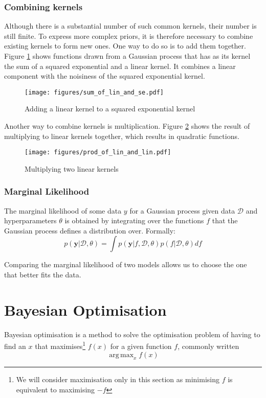 \documentclass[a4paper,12pt,twoside,openright]{report}
\DeclareMathOperator*{\argmax}{arg\,max}
\begin{document}
\subsubsection{Combining kernels}
Although there is a substantial number of such common kernels, their number is still finite. To express more complex priors, it is therefore necessary to combine existing kernels to form new ones. One way to do so is to add them together. Figure \ref{sum_of_lin_and_se} shows functions drawn from a Gaussian process that has as its kernel the sum of a squared exponential and a linear kernel. It combines a linear component with the noisiness of the squared exponential kernel.

\begin{figure}
\centering
  \texttt{[image: figures/sum\_of\_lin\_and\_se.pdf]}
  \caption{Adding a linear kernel to a squared exponential kernel}
  \label{sum_of_lin_and_se}
\end{figure}

Another way to combine kernels is multiplication. Figure \ref{prod_of_lin_and_lin} shows the result of multiplying to linear kernels together, which results in quadratic functions.

\begin{figure}
\centering
  \texttt{[image: figures/prod\_of\_lin\_and\_lin.pdf]}
  \caption{Multiplying two linear kernels}
  \label{prod_of_lin_and_lin}
\end{figure}

\subsubsection{Marginal Likelihood}
The marginal likelihood of some data $y$ for a Gaussian process given data $\mathcal{D}$ and hyperparameters $\theta$ is obtained by integrating over the functions $f$ that the Gaussian process defines a distribution over. Formally:
\begin{equation}
p(\mathbf{y}|\mathcal{D}, \theta) = \int p(\mathbf{y}|f, \mathcal{D}, \theta)p(f|\mathcal{D}, \theta) df
\end{equation}

Comparing the marginal likelihood of two models allows us to choose the one that better fits the data.

\section{Bayesian Optimisation}
Bayesian optimisation is a method to solve the optimisation problem of having to find an $x$ that maximises\footnote{We will consider maximisation only in this section as minimising $f$ is equivalent to maximising $-f$} $f(x)$ for a given function $f$, commonly written 
\begin{equation}
\argmax_x f(x)
\end{equation}
\end{document}
